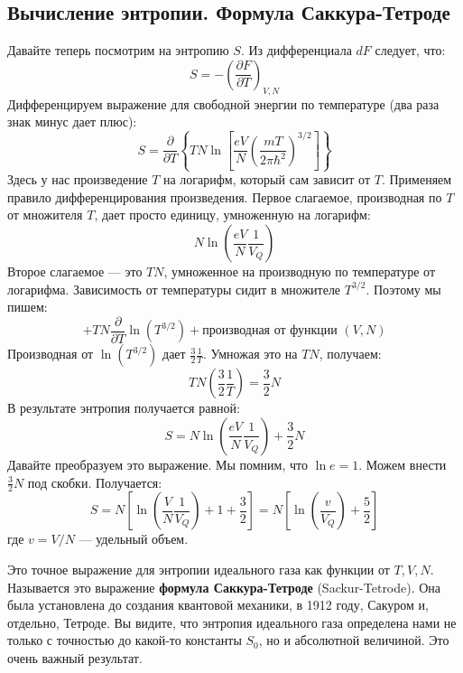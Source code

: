 \documentclass[../general/general]{subfiles}
\begin{document}
\subsection{Вычисление энтропии. Формула Саккура-Тетроде}

Давайте теперь посмотрим на энтропию $S$. Из дифференциала $dF$ следует, что:
\begin{equation}
    S = -\left( \frac{\partial F}{\partial T} \right)_{V,N}
\end{equation}
Дифференцируем выражение для свободной энергии по температуре (два раза знак минус дает плюс):
\begin{equation}
    S = \frac{\partial}{\partial T} \left\{ T N \ln \left[ \frac{e V}{N} \left( \frac{mT}{2\pi \hbar^2} \right)^{3/2} \right] \right\}
\end{equation}
Здесь у нас произведение $T$ на логарифм, который сам зависит от $T$. Применяем правило дифференцирования произведения. Первое слагаемое, производная по $T$ от множителя $T$, дает просто единицу, умноженную на логарифм:
\begin{equation}
    N \ln \left( \frac{e V}{N} \frac{1}{V_Q} \right)
\end{equation}
Второе слагаемое — это $TN$, умноженное на производную по температуре от логарифма. Зависимость от температуры сидит в множителе $T^{3/2}$. Поэтому мы пишем:
\begin{equation}
    + T N \frac{\partial}{\partial T} \ln \left( T^{3/2} \right) + \text{производная от функции }(V,N)
\end{equation}
Производная от $\ln(T^{3/2})$ дает $\frac{3}{2} \frac{1}{T}$. Умножая это на $T N$, получаем:
\begin{equation}
    T N \left( \frac{3}{2} \frac{1}{T} \right) = \frac{3}{2} N
\end{equation}
В результате энтропия получается равной:
\begin{equation}
    S = N \ln \left( \frac{e V}{N} \frac{1}{V_Q} \right) + \frac{3}{2} N
\end{equation}
Давайте преобразуем это выражение. Мы помним, что $\ln e = 1$. Можем внести $\frac{3}{2}N$ под скобки. Получается:
\begin{equation}
    S = N \left[ \ln \left( \frac{V}{N} \frac{1}{V_Q} \right) + 1 + \frac{3}{2} \right] = N \left[ \ln \left( \frac{v}{V_Q} \right) + \frac{5}{2} \right]
\end{equation}
где $v = V/N$ --- удельный объем. 

Это точное выражение для энтропии идеального газа как функции от $T, V, N$. Называется это выражение \textbf{формула Саккура-Тетроде} (Sackur-Tetrode). Она была установлена до создания квантовой механики, в 1912 году, Сакуром и, отдельно, Тетроде. Вы видите, что энтропия идеального газа определена нами не только с точностью до какой-то константы $S_0$, но и абсолютной величиной. Это очень важный результат.
\end{document}
